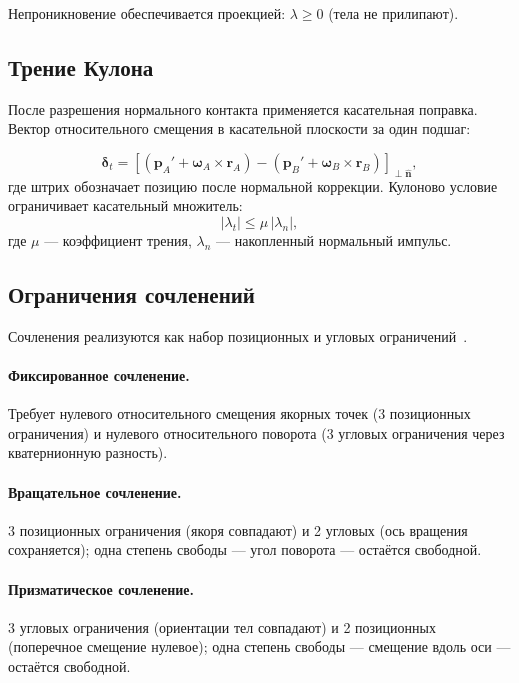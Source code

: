 Непроникновение обеспечивается проекцией: $\lambda \geq 0$ (тела не прилипают).

\subsection{Трение Кулона}

После разрешения нормального контакта применяется касательная поправка. Вектор относительного смещения в 
касательной плоскости за один подшаг:

\begin{equation}
  \boldsymbol{\delta}_t = \left[(\mathbf{p}_A' + \boldsymbol{\omega}_A \times \mathbf{r}_A)
    - (\mathbf{p}_B' + \boldsymbol{\omega}_B \times \mathbf{r}_B)\right]_{\perp \hat{\mathbf{n}}},
\end{equation}
где штрих обозначает позицию после нормальной коррекции.
Кулоново условие ограничивает касательный множитель:
\begin{equation}
  |\lambda_t| \leq \mu\,|\lambda_n|,
  \label{eq:coulomb}
\end{equation}
где $\mu$ --- коэффициент трения, $\lambda_n$ --- накопленный нормальный импульс.

\subsection{Ограничения сочленений}

Сочленения реализуются как набор позиционных и угловых ограничений~\cite{muller2007pbd}.

\paragraph{Фиксированное сочленение.} Требует нулевого относительного смещения якорных точек (3 позиционных 
ограничения) и нулевого относительного поворота (3 угловых ограничения через кватернионную разность).

\paragraph{Вращательное сочленение.} 3 позиционных ограничения (якоря совпадают) и 2 угловых (ось вращения 
сохраняется); одна степень свободы --- угол поворота --- остаётся свободной.

\paragraph{Призматическое сочленение.} 3 угловых ограничения (ориентации тел совпадают) и 2 позиционных 
(поперечное смещение нулевое); одна степень свободы --- смещение вдоль оси --- остаётся свободной.

